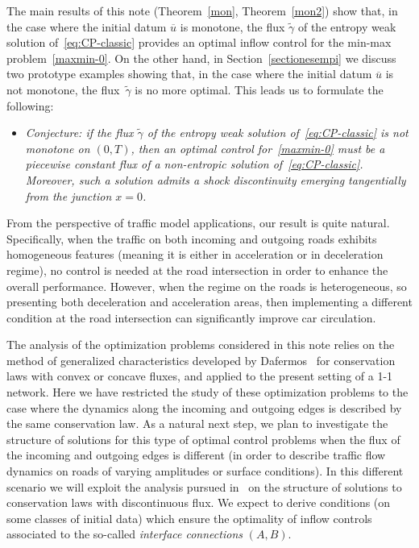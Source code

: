 \documentclass[a4paper, 10pt, final]{article}
\begin{document}
The main results of this note (Theorem~\ref{mon}, Theorem~\ref{mon2}) show that,
in the case where the initial datum $\overline u$ is monotone,
the flux $\widetilde\gamma$
of the entropy weak solution of~\eqref{eq:CP-classic} 
provides 
an optimal inflow control for the min-max problem~\eqref{maxmin-0}.
On the other hand, in Section~\ref{sectionesempi} we discuss  two prototype examples showing that, in the case where the 
initial datum $\overline u$ is not monotone, the flux~$\widetilde\gamma$ is no more optimal. 
This leads us to formulate the following:
\begin{itemize}
[leftmargin=14pt]
    \item[] 
    {\it Conjecture: if the flux $\widetilde \gamma$ of the  entropy weak solution of~\eqref{eq:CP-classic} is not monotone on $(0,T)$, then an optimal control 
    for~\eqref{maxmin-0}
    must be a piecewise constant flux of a non-entropic solution of~\eqref{eq:CP-classic}.
    Moreover, such a solution admits a shock discontinuity emerging tangentially from the junction $x=0$.
}
\end{itemize}

From the perspective of traffic model applications, our result is quite natural. 
Specifically, when the traffic on both incoming and outgoing roads exhibits homogeneous features 
(meaning it is either in acceleration or in  deceleration regime),   
no control is needed at the road intersection 
in order to enhance the overall performance. However, when the regime 
on the roads is heterogeneous, so presenting both deceleration and acceleration areas, 
then implementing a different condition at the road intersection can significantly improve car circulation.

 

The analysis of the optimization problems considered in this note relies %
on the method of generalized characteristics
developed by Dafermos~\cite{d,daf-book} for conservation laws with convex or concave fluxes, 
and applied to the present setting of
a 1-1 network.
Here we have restricted  the study of these optimization problems to the case 
where the dynamics along the incoming and outgoing edges is described by the
same conservation law. 
As a natural next step, we plan to investigate the structure of  solutions for this type of optimal control 
problems when the flux of the incoming and outgoing edges is different
(in order to describe traffic flow dynamics on roads of varying amplitudes or surface conditions). In this different scenario 
we will exploit the analysis pursued in~\cite{at1,at2}
on the structure of solutions to conservation laws with discontinuous flux. We expect 
to derive conditions (on some classes of initial data) which ensure 
 the optimality of inflow controls associated to the so-called {\it interface connections} $(A,B)$.
\end{document}
